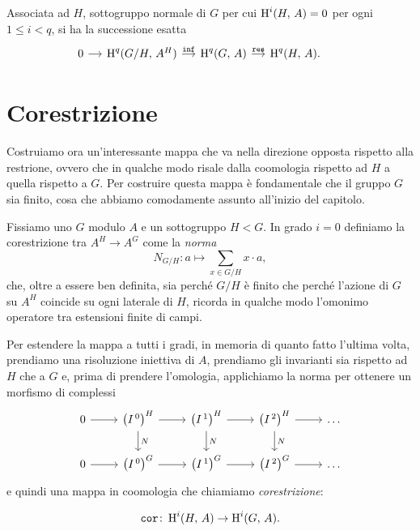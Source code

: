 \begin{corollary}
	Associata ad $ H $, sottogruppo normale di $ G $ per cui $ \operatorname{H}^i(H, \, A ) = 0 $ per ogni $ 1 \leq i < q $, si ha la successione esatta
	\[\begin{tikzcd}[column sep = small]
	0 \rar & \HH^q(G/H, \, A^H) \rar["\Inf"]
	& \HH^q(G, \, A) \rar["\Res"]
	& \HH^q(H, \, A).
	\end{tikzcd} \qquad  \]
\end{corollary}

\section{Corestrizione}
Costruiamo ora un'interessante mappa che va nella direzione opposta rispetto alla restrione, ovvero che in qualche modo risale dalla coomologia rispetto ad $ H $ a quella rispetto a $ G $. Per costruire questa mappa è fondamentale che il gruppo $ G $ sia finito, cosa che abbiamo comodamente assunto all'inizio del capitolo.

\begin{definition}[Corestrizione]
Fissiamo uno $ G $ modulo $ A $ e un sottogruppo $ H < G $. In grado $ i = 0 $ definiamo la corestrizione tra $ A^H \to A^G $  come la \emph{norma}
\[N_{G/H} \colon a \mapsto \sum_{x \in G/H} x \cdot a, \]
che, oltre a essere ben definita, sia perché $ G/H $ è finito che perché l'azione di $ G $ su $ A^H $ coincide su ogni laterale di $ H $, ricorda in qualche modo l'omonimo operatore tra estensioni finite di campi.

Per estendere la mappa a tutti i gradi, in memoria di quanto fatto l'ultima volta, prendiamo una risoluzione iniettiva di $ A $, prendiamo gli invarianti sia rispetto ad $ H $ che a $ G $ e, prima di prendere l'omologia, applichiamo la norma per ottenere un morfismo di complessi 
\[\begin{tikzcd}
0 \rar
& \left(I^{\,0}\right)^H \rar \dar["N"]
& \left(I^{\,1}\right)^H \rar \dar["N"]
& \left(I^{\,2}\right)^H \rar \dar["N"]
& \dots \\
0 \rar
& \left(I^{\,0}\right)^{G} \rar
& \left(I^{\,1}\right)^{G} \rar
& \left(I^{\,2}\right)^{G} \rar
& \dots
\end{tikzcd} \]
e quindi una mappa in coomologia che chiamiamo \emph{corestrizione}:

\[ \operatorname{\texttt{cor}} \colon \operatorname{H}^i(H, \, A) \to \operatorname{H}^i(G, \, A). \]

\end{definition}

